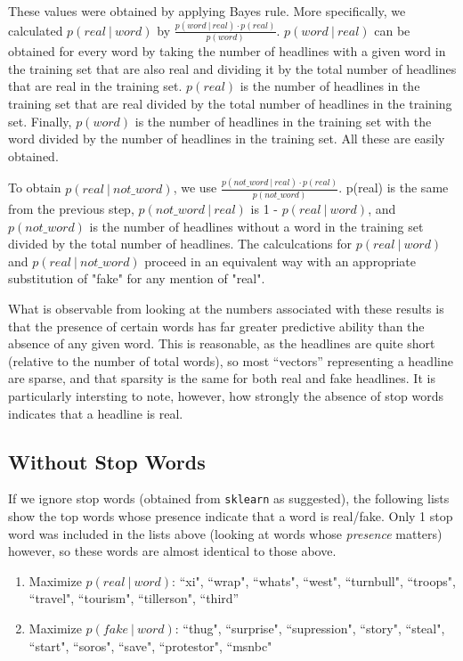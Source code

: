 \documentclass{article}
\begin{document}
   These values were obtained by applying Bayes rule. More specifically, we calculated $p(real \ |\ word)$ by
   $ \frac {p(word \ |\ real) \cdot p(real)}{p(word)}$. $p(word \ |\ real)$ can be obtained for every word by taking
   the number of headlines with a given word in the training set that are also real and dividing it by the
   total number of headlines that are real in the training set. $p(real)$ is the number of headlines in the
   training set that are real divided by the total number of headlines in the training set. Finally, $p(word)$ is
   the number of headlines in the training set with the word divided by the number of headlines in the training set.
   All these are easily obtained.

   To obtain $p(real \ |\ not\_word)$, we use $ \frac {p(not\_word \ |\ real) \cdot p(real)}{p(not\_word)}$. p(real)
   is the same from the previous step, $p(not\_word \ |\ real)$ is 1 - $p(real \ |\ word)$, and $p(not\_word)$ is the
   number of headlines without a word in the training  set divided by the total number of headlines.
   The calculcations for $p(real \ |\ word)$ and $p(real \ |\ not\_word)$ proceed in an equivalent way with an
   appropriate substitution of "fake" for any mention of "real".

   What is observable from looking at the numbers associated with these results is that the presence of certain
   words has far greater predictive ability than the absence of any given word. This is reasonable,
   as the headlines are quite short (relative to the number of total words), so most ``vectors'' representing
   a headline are sparse, and that sparsity is the same for both real and fake headlines.
   It is particularly intersting to note, however, how strongly the absence of stop words indicates that a
   headline is real.

   \subsection{Without Stop Words}
   If we ignore stop words (obtained from \texttt{sklearn} as suggested), the following lists show the top words
   whose presence indicate that a word is real/fake. Only 1 stop word was included in the lists above (looking at
   words whose \textit{presence} matters) however, so these words are almost identical to those above.
   \begin{enumerate}
      \item Maximize $p(real \ |\ word)$:
         ``xi", ``wrap", ``whats", ``west", ``turnbull", ``troops", ``travel", ``tourism", ``tillerson", ``third'' %
      \item Maximize $p(fake \ |\ word)$:
         ``thug", ``surprise", ``supression", ``story", ``steal", ``start", ``soros", ``save", ``protestor", ``msnbc"
   \end{enumerate}
\end{document}
